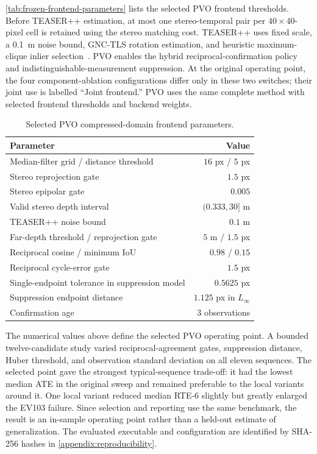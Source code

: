 \autoref{tab:frozen-frontend-parameters} lists the selected PVO frontend thresholds. Before
TEASER++ estimation, at most one stereo-temporal pair per
$40\times40$-pixel cell is retained using the stereo matching cost. TEASER++
uses fixed scale, a \SI{0.1}{\metre} noise bound, GNC-TLS rotation estimation,
and heuristic maximum-clique inlier selection~\cite{yang2020teaser}. PVO enables the
hybrid reciprocal-confirmation policy and indistinguishable-measurement
suppression. At the original operating point, the four component-ablation
configurations differ only in these two switches; their joint use is labelled
``Joint frontend.'' PVO uses the same complete method with selected frontend
thresholds and backend weights.

\begin{table}[htbp]
  \centering
  \caption[Selected PVO frontend parameters]{Selected PVO compressed-domain frontend parameters.}
  \label{tab:frozen-frontend-parameters}
  \begin{tabular}{@{}lr@{}}
    \toprule
    Parameter & Value \\
    \midrule
    Median-filter grid / distance threshold & $16$ px / $5$ px \\
    Stereo reprojection gate & $1.5$ px \\
    Stereo epipolar gate & $0.005$ \\
    Valid stereo depth interval & $(0.333,30]$ m \\
    TEASER++ noise bound & $0.1$ m \\
    Far-depth threshold / reprojection gate & $5$ m / $1.5$ px \\
    Reciprocal cosine / minimum IoU & $0.98$ / $0.15$ \\
    Reciprocal cycle-error gate & $1.5$ px \\
    Single-endpoint tolerance in suppression model & $0.5625$ px \\
    Suppression endpoint distance & $1.125$ px in $L_\infty$ \\
    Confirmation age & 3 observations \\
    \bottomrule
  \end{tabular}
\end{table}

The numerical values above define the selected PVO operating point. A bounded
twelve-candidate study varied reciprocal-agreement gates, suppression distance,
Huber threshold, and observation standard deviation on all eleven sequences.
The selected point gave the strongest typical-sequence trade-off: it had the lowest
median ATE in the original sweep and remained preferable to the local variants
around it. One local variant reduced median RTE-6 slightly but greatly enlarged
the EV103 failure. Since selection and reporting use the same benchmark, the
result is an in-sample operating point rather than a held-out estimate of
generalization. The evaluated executable and configuration are identified by
SHA-256 hashes in \autoref{appendix:reproducibility}.

